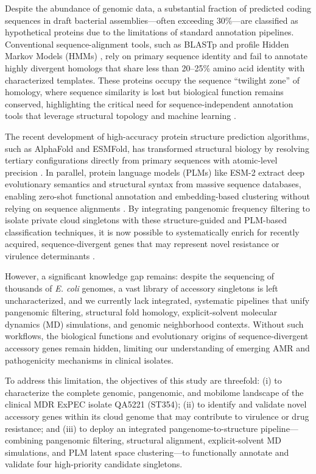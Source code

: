 \documentclass[pdflatex,sn-mathphys-num]{sn-jnl}
\begin{document}
Despite the abundance of genomic data, a substantial fraction of predicted coding sequences in draft bacterial assemblies—often exceeding 30\%—are classified as hypothetical proteins due to the limitations of standard annotation pipelines. Conventional sequence-alignment tools, such as BLASTp \cite{altschul1990basic} and profile Hidden Markov Models (HMMs) \cite{eddy2011accelerated,mistry2021pfam}, rely on primary sequence identity and fail to annotate highly divergent homologs that share less than 20--25\% amino acid identity with characterized templates. These proteins occupy the sequence ``twilight zone'' of homology, where sequence similarity is lost but biological function remains conserved, highlighting the critical need for sequence-independent annotation tools that leverage structural topology and machine learning \cite{mirdita2022foldseek,zhang2005tm}.

The recent development of high-accuracy protein structure prediction algorithms, such as AlphaFold and ESMFold, has transformed structural biology by resolving tertiary configurations directly from primary sequences with atomic-level precision \cite{jumper2021highly,abramson2024accurate,lin2023evolutionary}. In parallel, protein language models (PLMs) like ESM-2 extract deep evolutionary semantics and structural syntax from massive sequence databases, enabling zero-shot functional annotation and embedding-based clustering without relying on sequence alignments \cite{rives2021biological,heinzinger2021elucidating,zheng2026plm}. By integrating pangenomic frequency filtering to isolate private cloud singletons with these structure-guided and PLM-based classification techniques, it is now possible to systematically enrich for recently acquired, sequence-divergent genes that may represent novel resistance or virulence determinants \cite{hie2022evolutionary,madani2023large}.

However, a significant knowledge gap remains: despite the sequencing of thousands of \textit{E. coli} genomes, a vast library of accessory singletons is left uncharacterized, and we currently lack integrated, systematic pipelines that unify pangenomic filtering, structural fold homology, explicit-solvent molecular dynamics (MD) simulations, and genomic neighborhood contexts. Without such workflows, the biological functions and evolutionary origins of sequence-divergent accessory genes remain hidden, limiting our understanding of emerging AMR and pathogenicity mechanisms in clinical isolates.

To address this limitation, the objectives of this study are threefold: (i) to characterize the complete genomic, pangenomic, and mobilome landscape of the clinical MDR ExPEC isolate QA5221 (ST354); (ii) to identify and validate novel accessory genes within its cloud genome that may contribute to virulence or drug resistance; and (iii) to deploy an integrated pangenome-to-structure pipeline—combining pangenomic filtering, structural alignment, explicit-solvent MD simulations, and PLM latent space clustering—to functionally annotate and validate four high-priority candidate singletons.
\end{document}
